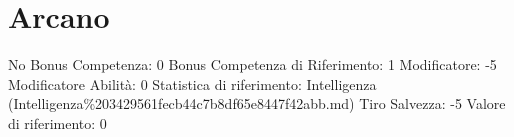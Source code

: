 \section{Arcano}\label{arcano}

\begin{description}
\tightlist
\item[Tags: ABI]
No Bonus Competenza: 0 Bonus Competenza di Riferimento: 1 Modificatore:
-5 Modificatore Abilità: 0 Statistica di riferimento: Intelligenza
(Intelligenza\%203429561fecb44c7b8df65e8447f42abb.md) Tiro Salvezza: -5
Valore di riferimento: 0
\end{description}
